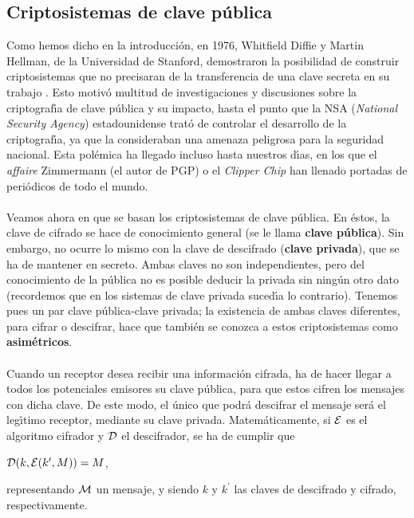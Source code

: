 \subsection{Criptosistemas de clave p\'ublica}
Como hemos dicho en la introducci\'on, en 1976, Whitfield Diffie y Martin 
Hellman, de la Universidad de Stanford,
demostraron la posibilidad de construir criptosistemas que no precisaran
de la transferencia de una clave secreta en su trabajo \cite{kn:dh76}. Esto 
motiv\'o multitud de investigaciones y discusiones sobre la criptograf\'{\i}a 
de clave p\'ublica y su impacto, hasta el punto que
la NSA ({\it National Security Agency}) estadounidense trat\'o de controlar
el desarrollo de la criptograf\'{\i}a, ya que la consideraban una amenaza 
peligrosa para la seguridad nacional. Esta pol\'emica ha llegado incluso hasta 
nuestros d\'{\i}as, en los que el {\it affaire} Zimmermann (el autor de PGP) o 
el {\it Clipper Chip} han llenado portadas de peri\'odicos de todo el mundo.\\
\\Veamos ahora en que se basan los criptosistemas de clave p\'ublica.
En \'estos, la clave de cifrado se hace de conocimiento general (se
le llama {\bf clave p\'ublica}). Sin embargo, no ocurre lo mismo con la
clave de descifrado ({\bf clave privada}), que se ha de mantener en secreto.
Ambas claves no son independientes, pero del conocimiento de la p\'ublica
no es posible deducir la privada sin ning\'un otro dato (recordemos que en los
sistemas de clave privada suced\'{\i}a lo contrario). Tenemos pues un par 
clave p\'ublica-clave privada; la existencia de ambas claves di\-fe\-ren\-tes, para
cifrar o descifrar, hace que tambi\'en se conozca a estos criptosistemas como
{\bf asim\'etricos}.\\
\\Cuando un receptor desea recibir una informaci\'on cifrada, ha
de hacer llegar a todos los potenciales emisores su clave p\'ublica,
para que estos cifren los mensajes con dicha clave. De este modo, el \'unico
que podr\'a descifrar el mensaje ser\'a el leg\'{\i}timo receptor,
mediante su clave privada. Matem\'aticamente, si $\cal E$ es el algoritmo
cifrador y $\cal D$ el descifrador, se ha de cumplir que 
\begin{center}${\cal D}(k,{\cal E}(k^{\prime},M))=M$,
\end{center}
representando $\cal M$ un mensaje, y siendo $k$ y $k^{\prime}$ las claves de 
descifrado y cifrado, respectivamente.
